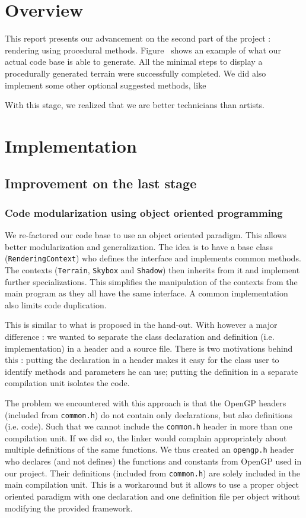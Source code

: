 \documentclass[a4paper,11pt]{article}
\begin{document}
\section{Overview}

This report presents our advancement on the second part of the project : rendering using procedural methods. Figure~ shows an example of what our actual code base is able to generate. All the minimal steps to display a procedurally generated terrain were successfully completed. We did also implement some other optional suggested methods, like 

With this stage, we realized that we are better technicians than artists.

\section{Implementation}

\subsection{Improvement on the last stage}

\subsubsection{Code modularization using object oriented programming}

We re-factored our code base to use an object oriented paradigm. This allows better modularization and generalization. The idea is to have a base class (\texttt{RenderingContext}) who defines the interface and implements common methods. The contexts (\texttt{Terrain}, \texttt{Skybox} and \texttt{Shadow}) then inherits from it and implement further specializations. This simplifies the manipulation of the contexts from the main program as they all have the same interface. A common implementation also limits code duplication.

This is similar to what is proposed in the hand-out. With however a major difference : we wanted to separate the class declaration and definition (i.e. implementation) in a header and a source file. There is two motivations behind this : putting the declaration in a header makes it easy for the class user to identify methods and parameters he can use; putting the definition in a separate compilation unit isolates the code.

The problem we encountered with this approach is that the OpenGP headers (included from \texttt{common.h}) do not contain only declarations, but also definitions (i.e. code). Such that we cannot include the \texttt{common.h} header in more than one compilation unit. If we did so, the linker would complain appropriately about multiple definitions of the same functions. We thus created an \texttt{opengp.h} header who declares (and not defines) the functions and constants from OpenGP used in our project. Their definitions (included from \texttt{common.h}) are solely included in the main compilation unit. This is a workaround but it allows to use a proper object oriented paradigm with one declaration and one definition file per object without modifying the provided framework.
\end{document}
